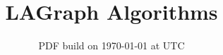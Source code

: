\documentclass{article}
\begin{document}
\title{LAGraph Algorithms}
\date{PDF build on \today{} at \currenttime{} UTC}

\maketitle

\begin{abstract}

\end{abstract}








%

\clearpage



\end{document}
